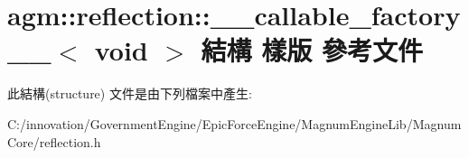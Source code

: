 \hypertarget{structagm_1_1reflection_1_1____callable__factory_____3_01void_01_4}{}\section{agm\+:\+:reflection\+:\+:\+\_\+\+\_\+callable\+\_\+factory\+\_\+\+\_\+$<$ void $>$ 結構 樣版 參考文件}
\label{structagm_1_1reflection_1_1____callable__factory_____3_01void_01_4}


此結構(structure) 文件是由下列檔案中產生\+:\begin{DoxyCompactItemize}
\item 
C\+:/innovation/\+Government\+Engine/\+Epic\+Force\+Engine/\+Magnum\+Engine\+Lib/\+Magnum\+Core/reflection.\+h\end{DoxyCompactItemize}
